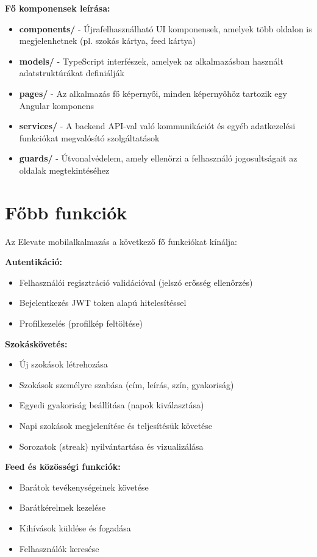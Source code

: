 \documentclass[12pt]{report}
\begin{document}
\textbf{Fő komponensek leírása:}
\begin{itemize}
  \item \textbf{components/} - Újrafelhasználható UI komponensek, amelyek több oldalon is megjelenhetnek (pl. szokás kártya, feed kártya)
  \item \textbf{models/} - TypeScript interfészek, amelyek az alkalmazásban használt adatstruktúrákat definiálják
  \item \textbf{pages/} - Az alkalmazás fő képernyői, minden képernyőhöz tartozik egy Angular komponens
  \item \textbf{services/} - A backend API-val való kommunikációt és egyéb adatkezelési funkciókat megvalósító szolgáltatások
  \item \textbf{guards/} - Útvonalvédelem, amely ellenőrzi a felhasználó jogosultságait az oldalak megtekintéséhez
\end{itemize}

\section{Főbb funkciók}
Az Elevate mobilalkalmazás a következő fő funkciókat kínálja:

\textbf{Autentikáció:}
\begin{itemize}
  \item Felhasználói regisztráció validációval (jelszó erősség ellenőrzés)
  \item Bejelentkezés JWT token alapú hitelesítéssel
  \item Profilkezelés (profilkép feltöltése)
\end{itemize}

\textbf{Szokáskövetés:}
\begin{itemize}
  \item Új szokások létrehozása 
  \item Szokások személyre szabása (cím, leírás, szín, gyakoriság)
  \item Egyedi gyakoriság beállítása (napok kiválasztása)
  \item Napi szokások megjelenítése és teljesítésük követése
  \item Sorozatok (streak) nyilvántartása és vizualizálása
\end{itemize}

\textbf{Feed és közösségi funkciók:}
\begin{itemize}
  \item Barátok tevékenységeinek követése
  \item Barátkérelmek kezelése
  \item Kihívások küldése és fogadása
  \item Felhasználók keresése
\end{itemize}
\end{document}
